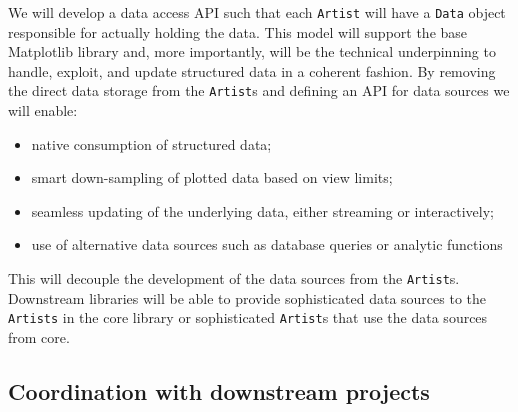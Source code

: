 \documentclass[11pt,letterpaper]{article}  %
\begin{document}
We will develop a data access API such that each \texttt{Artist} will
have a \texttt{Data} object responsible for actually holding the data.
This model will support the base Matplotlib library and, more
importantly, will be the technical underpinning to handle, exploit, and
update structured data in a coherent fashion.
By removing the direct data storage from
the \texttt{Artist}s and defining an API for data sources we will enable:
\begin{itemize}[noitemsep]
  \item native consumption of structured data;
  \item smart down-sampling of plotted data based on view limits;
  \item seamless updating of the underlying data, either
    streaming or interactively;
  \item use of alternative data sources such as database queries or analytic functions
\end{itemize}
This will decouple the development of the data sources from the
\texttt{Artist}s.  Downstream libraries will be able to provide
sophisticated data sources to the \texttt{Artists} in the core library
or sophisticated \texttt{Artist}s that use the data sources from
core.


%
%
%

\subsection{Coordination with downstream projects}
\end{document}

